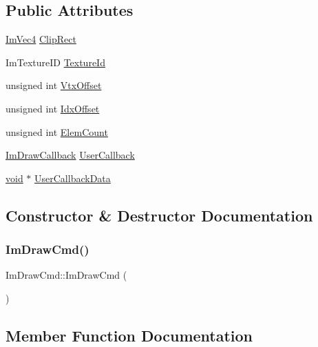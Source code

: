 \subsection*{Public Attributes}
\begin{DoxyCompactItemize}
\item 
\hyperlink{structImVec4}{Im\+Vec4} \hyperlink{structImDrawCmd_a838918f420ff81cb8dc7265077592daa}{Clip\+Rect}
\item 
Im\+Texture\+ID \hyperlink{structImDrawCmd_a4f3b5985ece9ca6b71e7a8e7d85a82e5}{Texture\+Id}
\item 
unsigned int \hyperlink{structImDrawCmd_a604086d3c94a18b3a79f171ee37edabb}{Vtx\+Offset}
\item 
unsigned int \hyperlink{structImDrawCmd_adec5adcd0cc6cf0da193bf0437fbba47}{Idx\+Offset}
\item 
unsigned int \hyperlink{structImDrawCmd_aafe2532964fb1f6905d67d84dd3e8730}{Elem\+Count}
\item 
\hyperlink{imgui_8h_a232a477233f9e3ab7640720bf94674de}{Im\+Draw\+Callback} \hyperlink{structImDrawCmd_ad26dac4e939f5c4bb892cbca0f9e3af8}{User\+Callback}
\item 
\hyperlink{imgui__impl__opengl3__loader_8h_ac668e7cffd9e2e9cfee428b9b2f34fa7}{void} $\ast$ \hyperlink{structImDrawCmd_ae2f5a0baf4a0b25942237b8ce6adb42d}{User\+Callback\+Data}
\end{DoxyCompactItemize}


\subsection{Constructor \& Destructor Documentation}
\mbox{\label{structImDrawCmd_adcf30cacb8e6b747e90000603c87f1e3}} 
\subsubsection{\texorpdfstring{Im\+Draw\+Cmd()}{ImDrawCmd()}}
{\footnotesize\ttfamily Im\+Draw\+Cmd\+::\+Im\+Draw\+Cmd (\begin{DoxyParamCaption}{ }\end{DoxyParamCaption})\hspace{0.3cm}{\ttfamily [inline]}}



\subsection{Member Function Documentation}
\mbox{\label{structImDrawCmd_a8ba7df6d136db6e33d850acc9291224f}} 
